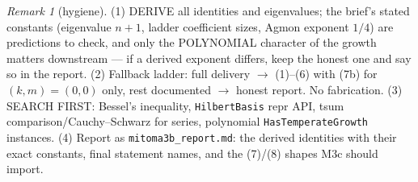 \documentclass[11pt]{article}
\theoremstyle{plain}
\theoremstyle{remark}
\newtheorem{remark}{Remark}
\begin{document}
\begin{remark}[hygiene]
(1) DERIVE all identities and eigenvalues; the brief's stated constants
(eigenvalue $n+1$, ladder coefficient sizes, Agmon exponent $1/4$) are
predictions to check, and only the POLYNOMIAL character of the growth
matters downstream --- if a derived exponent differs, keep the honest one
and say so in the report.
(2) Fallback ladder: full delivery $\to$ (1)--(6) with (7b) for
$(k,m)=(0,0)$ only, rest documented $\to$ honest report. No fabrication.
(3) SEARCH FIRST: Bessel's inequality, \texttt{HilbertBasis} repr API,
tsum comparison/Cauchy--Schwarz for series, polynomial
\texttt{HasTemperateGrowth} instances.
(4) Report as \texttt{mitoma3b\_report.md}: the derived identities with
their exact constants, final statement names, and the (7)/(8) shapes M3c
should import.
\end{remark}
\end{document}

